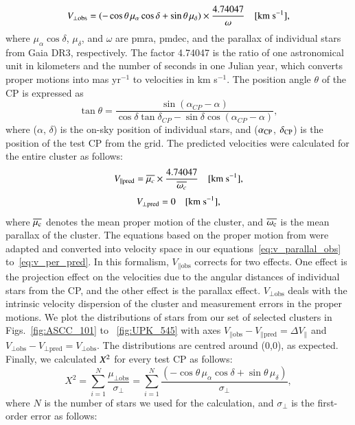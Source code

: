 \documentclass{aa}
\begin{document}
\begin{equation}
V_{\perp \text{obs}} = (-\cos\theta \, \mu_{\alpha}\cos\delta + \sin\theta \, \mu_{\delta} ) \times \frac{4.74047}{\omega} \quad [\rm{km \ s^{-1}}],
\end{equation}
where $\mu_{\alpha}\cos\delta$, $\mu_{\delta}$, and $\omega$ are pmra, pmdec, and the parallax of individual stars from Gaia DR3, respectively. The factor 4.74047 is the ratio of one astronomical unit in kilometers and the number of seconds in one Julian year, which converts proper motions into mas yr$^{-1}$ to velocities in km s$^{-1}$. The position angle $\theta$ of the CP is expressed as
\begin{equation}
\tan{\theta} = \frac{\sin({\alpha_{CP}} - \alpha)}{\cos\delta\tan\delta_{CP} - \sin\delta \cos({\alpha_{CP}} - \alpha)},
\end{equation}
where ($\alpha$, $\delta$) is the on-sky position of individual stars, and ($\alpha\textsubscript{CP}$, $\delta\textsubscript{CP}$) is the position of the test CP from the grid. The predicted velocities were calculated for the entire cluster as follows: 
\begin{equation}
V_{\parallel \text{pred}} = \overline{\mu_{c}} \times\frac{ 4.74047}{\overline{\omega_{c}}} \quad [\rm{km \ s^{-1}}],
\end{equation}
\begin{equation} \label{eq:v_per_pred}
V_{\perp \text{pred}} = 0  \quad [\rm{km \ s^{-1}}],
\end{equation}
where $\overline{\mu\textsubscript{c}}$ denotes the mean proper motion of the cluster, and $\overline{\omega\textsubscript{c}}$ is the mean parallax of the cluster. The equations based on the proper motion from \citet{1999MNRAS.306..381D} were adapted and converted into velocity space in our equations~\ref{eq:v_parallal_obs} to~\ref{eq:v_per_pred}. 
In this formalism, $V_{\parallel \text{obs}}$ corrects for two effects. One effect is the projection effect on the velocities due to the angular distances of individual stars from the CP, and the other effect is the parallax effect. $V_{\perp \text{obs}}$ deals with the intrinsic velocity dispersion of the cluster and measurement errors in the proper motions. We plot the distributions of stars from our set of selected clusters in Figs.~\ref{fig:ASCC_101} to ~\ref{fig:UPK_545} with axes $V_{\parallel \text{obs}} - V_{\parallel \text{pred}} = \Delta V_{\parallel}$  and $V_{\perp \text{obs}} - V_{\perp \text{pred}} = V_{\perp \text{obs}}$. The distributions are centred around (0,0), as expected. Finally, we calculated $X\textsuperscript{2}$ for every test CP as follows:
\begin{equation}
X^{2} = \sum_{i=1}^{N} \frac{\mu_{\perp \text{obs}}}{\sigma_{\perp}} = \sum_{i=1}^{N} \frac{(-\cos\theta \, \mu_{\alpha}\cos\delta + \sin\theta \, \mu_{\delta} )}{\sigma_{\perp}},
\end{equation}
where $N$ is the number of stars we used for the calculation, and $\sigma_{\perp}$ is the first-order error as follows:
\end{document}
